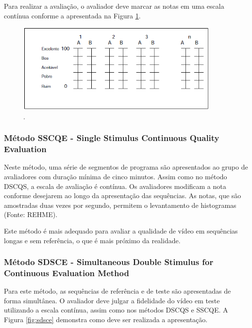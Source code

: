 Para realizar a avaliação, o avaliador deve marcar as notas em uma escala contínua conforme a apresentada na Figura \ref{fig:dscqsescala}.

\begin{figure}[!htb]
	\centering
	\includegraphics[width=0.9\textwidth]{./imgs/dscqsescala.png}
	\caption{.}
	\label{fig:dscqsescala}
\end{figure}

\subsubsection{Método SSCQE - Single Stimulus Continuous Quality Evaluation}

Neste método, uma série de segmentos de programa são apresentados ao grupo de avaliadores com duração mínima de cinco minutos. Assim como no método DSCQS, a escala de avaliação é contínua. Os avaliadores modificam a nota conforme desejarem ao longo da apresentação das sequências. As notas, que são amostradas duas vezes por segundo, permitem o levantamento de histogramas (Fonte: REHME).

Este método é mais adequado para avaliar a qualidade de vídeo em sequências longas e sem referência, o que é mais próximo da realidade.

\subsubsection{Método SDSCE - Simultaneous Double Stimulus for Continuous Evaluation Method}

Para este método, as sequências de referência e de teste são apresentadas de forma simultânea. O avaliador deve julgar a fidelidade do vídeo em teste utilizando a escala contínua, assim como nos métodos DSCQS e SSCQE. A Figura \ref{fig:sdsce} demonstra como deve ser realizada a apresentação.

